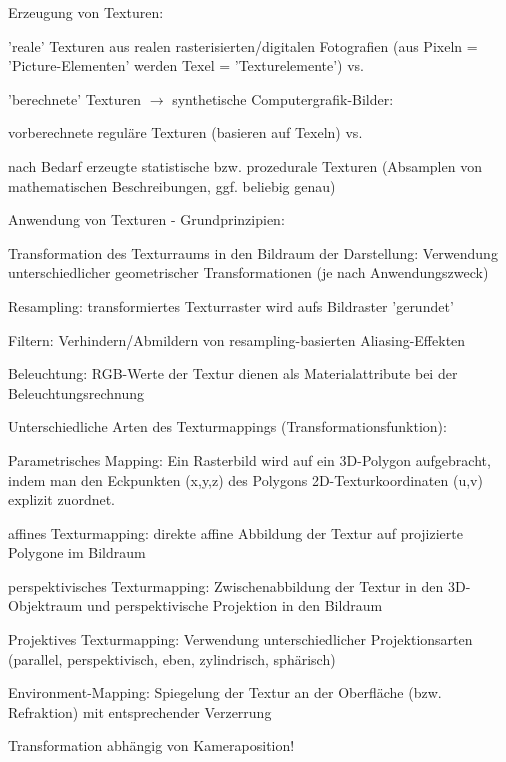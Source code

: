 \documentclass[landscape]{article}
\begin{document}
\begin{multicols}{3}
  Erzeugung von Texturen:
  \begin{itemize*}
    \item 'reale' Texturen aus realen rasterisierten/digitalen Fotografien (aus Pixeln = 'Picture-Elementen' werden Texel = 'Texturelemente') vs.
    \item 'berechnete' Texturen $\rightarrow$ synthetische Computergrafik-Bilder:
    \item vorberechnete reguläre Texturen (basieren auf Texeln) vs.
    \item nach Bedarf erzeugte statistische bzw. prozedurale Texturen (Absamplen von mathematischen Beschreibungen, ggf. beliebig genau)
  \end{itemize*}
  
  Anwendung von Texturen - Grundprinzipien:
  \begin{itemize*}
    \item Transformation des Texturraums in den Bildraum der Darstellung: Verwendung unterschiedlicher geometrischer Transformationen (je nach Anwendungszweck)
    \item Resampling: transformiertes Texturraster wird aufs Bildraster 'gerundet'
    \item Filtern: Verhindern/Abmildern von resampling-basierten Aliasing-Effekten
    \item Beleuchtung: RGB-Werte der Textur dienen als Materialattribute bei der Beleuchtungsrechnung
  \end{itemize*}
  
  Unterschiedliche Arten des Texturmappings (Transformationsfunktion):
  \begin{itemize*}
    \item Parametrisches Mapping: Ein Rasterbild wird auf ein 3D-Polygon aufgebracht, indem man den Eckpunkten (x,y,z) des Polygons 2D-Texturkoordinaten (u,v) explizit zuordnet.
    \item affines Texturmapping: direkte affine Abbildung der Textur auf projizierte Polygone im Bildraum
    \item perspektivisches Texturmapping: Zwischenabbildung der Textur in den 3D-Objektraum und perspektivische Projektion in den Bildraum
    \item Projektives Texturmapping: Verwendung unterschiedlicher Projektionsarten (parallel, perspektivisch, eben, zylindrisch, sphärisch)
    \item Environment-Mapping: Spiegelung der Textur an der Oberfläche (bzw. Refraktion) mit entsprechender Verzerrung
    \item Transformation abhängig von Kameraposition!
  \end{itemize*}
  

\end{multicols}
\end{document}

